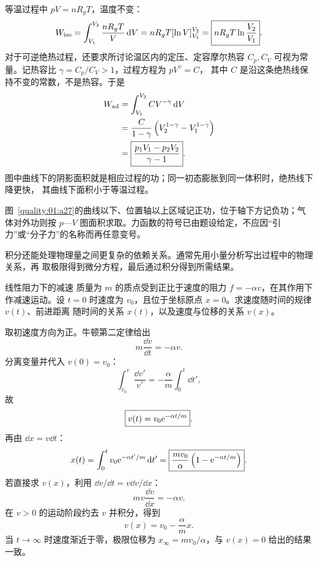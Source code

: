 {\begin{xesolution}
等温过程中 $pV=nR_gT$，温度不变：
\[
 W_{\rm iso}=\int_{V_1}^{V_2}\frac{nR_gT}{V}\mathop{}\!\mathrm d V
 =nR_gT[\ln V]_{V_1}^{V_2}
 =\boxed{nR_gT\ln\frac{V_2}{V_1}}.
\]
对于可逆绝热过程，还要求所讨论温区内的定压、定容摩尔热容 $C_p,C_V$
可视为常量。记热容比 $\gamma=C_p/C_V>1$，过程方程为 $pV^\gamma=C$，
其中 $C$ 是沿这条绝热线保持不变的常数，不是热容。于是
\begin{align*}
 W_{\rm ad}
 &=\int_{V_1}^{V_2}CV^{-\gamma}\mathop{}\!\mathrm d V\\
 &=\frac{C}{1-\gamma}
   \left(V_2^{1-\gamma}-V_1^{1-\gamma}\right)\\
 &=\boxed{\frac{p_1V_1-p_2V_2}{\gamma-1}}.
\end{align*}
图中曲线下的阴影面积就是相应过程的功；同一初态膨胀到同一体积时，绝热线下降更快，
其曲线下面积小于等温过程。


图~\ref{quality:01:a27}的曲线以下、位置轴以上区域记正功，位于轴下方记负功；气体对外功则按 $p$—$V$ 图面积求取。力函数的符号已由题设给定，不应因“引力”或“分子力”的名称而再任意变号。
\end{xesolution}

积分还能处理物理量之间更复杂的依赖关系。通常先用小量分析写出过程中的物理关系，再
取极限得到微分方程，最后通过积分得到所需结果。

\begin{origexamplebox}{线性阻力下的减速}\label{ch01:ex:s15-1-23}
质量为 $m$ 的质点受到正比于速度的阻力 $f=-\alpha v$，在其作用下作减速运动。设
$t=0$ 时速度为 $v_0$，且位于坐标原点 $x=0$。求速度随时间的规律 $v(t)$、前进距离
随时间的关系 $x(t)$，以及速度与位移的关系 $v(x)$。

\end{origexamplebox}

\begin{xesolution}
取初速度方向为正。牛顿第二定律给出
\[
 m\frac{\dd v}{\dd t}=-\alpha v.
\]
分离变量并代入 $v(0)=v_0$：
\[
 \int_{v_0}^{v}\frac{\dd v'}{v'}
 =-\frac\alpha m\int_0^t\dd t',
\]
故
\[
 \boxed{v(t)=v_0\mathrm e^{-\alpha t/m}}.
\]
再由 $\dd x=v\dd t$：
\[
 x(t)=\int_0^tv_0\mathrm e^{-\alpha t'/m}\mathop{}\!\mathrm d t'
 =\boxed{\frac{mv_0}{\alpha}
 \left(1-\mathrm e^{-\alpha t/m}\right)}.
\]
若直接求 $v(x)$，利用 $\dd v/\dd t=v\dd v/\dd x$：
\[
 mv\frac{\dd v}{\dd x}=-\alpha v.
\]
在 $v>0$ 的运动阶段约去 $v$ 并积分，得到
\[
 \boxed{v(x)=v_0-\frac\alpha m x}.
\]
当 $t\to\infty$ 时速度渐近于零，极限位移为
$x_\infty=mv_0/\alpha$，与 $v(x)=0$ 给出的结果一致。


\end{xesolution}}
